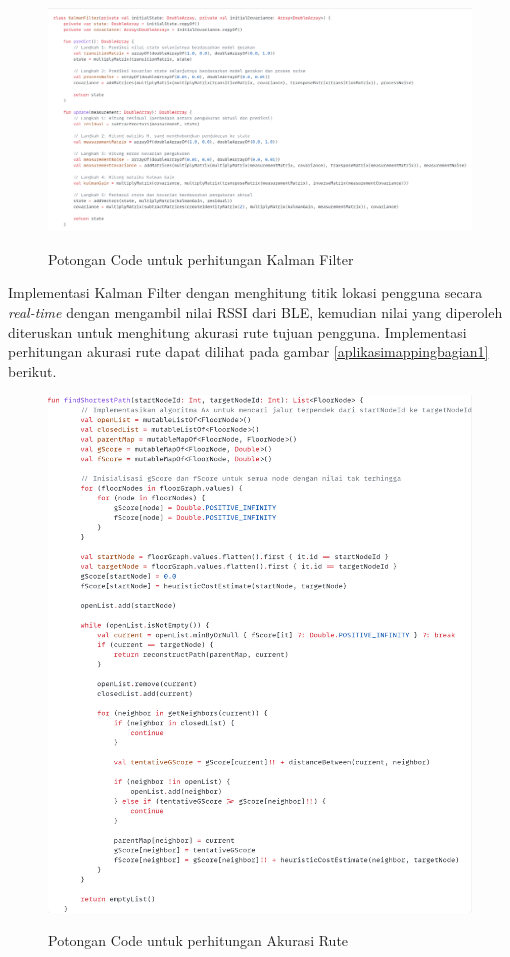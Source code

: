 \begin{enumerate}
\begin{figure}[H]
\centering
{\includegraphics [scale = 0.2]{gambar/bab4/kalmanfilter}}
\caption{Potongan Code untuk perhitungan Kalman Filter}
\label{img:kalmanfiltercode}
\end{figure}

\par Implementasi Kalman Filter dengan menghitung titik lokasi pengguna secara \textit{real-time} dengan mengambil nilai RSSI dari BLE, kemudian nilai yang diperoleh diteruskan untuk menghitung akurasi rute tujuan pengguna. Implementasi perhitungan akurasi rute dapat dilihat pada gambar \ref{aplikasimappingbagian1} berikut.

\begin{figure}[H]
\centering
{\includegraphics [scale = 0.2]{gambar/bab4/path}}
\caption{Potongan Code untuk perhitungan Akurasi Rute}
\label{img:rutecode}
\end{figure}


\end{enumerate}
